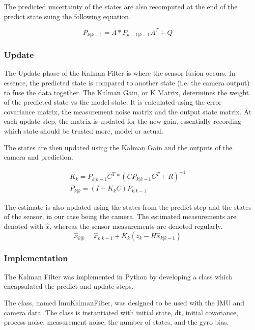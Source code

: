 \documentclass[bare_jrnl_transmag]{subfiles}
\begin{document}
The predicted uncertainty of the states are also recomputed at the end of the predict state suing the following equation.

\begin{equation*}
    P_{k|k-1} = A * P_{k-1|k-1} A^T + Q
\end{equation*}


    
\subsubsection{Update}
The Update phase of the Kalman Filter is where the sensor fusion occurs. In essence, the predicted state is compared to another state (i.e. the camera output) to fuse the data together. 
The Kalman Gain, or K Matrix, determines the weight of the predicted state vs the model state. It is calculated using the error covariance matrix, the measurement noise matrix and the output state matrix. 
At each update step, the matrix is updated for the new gain, essentially recording which state should be trusted more, model or actual.

The states are then updated using the Kalman Gain and the outputs of the camera and prediction.

\begin{eqnarray*}
    K_k = P_{k|k-1} C^T * (C P_{k|k-1} C^T + R)^{-1} \\[1em]
    P_{k|k} = (I - K_k C) P_{k|k-1}
\end{eqnarray*}

The estimate is also updated using the states from the predict step and the states of the sensor, in our case being the camera. 
The estimated measurements are denoted with $\hat{x}$, whereas the sensor measurements are denoted regularly. 
\begin{equation*}
    \hat{x}_{k|k} = \hat{x}_{k|k-1} + K_k (z_k - H \hat{x}_{k|k-1})
\end{equation*}

\subsubsection{Implementation}

The Kalman Filter was implemented in Python by developing a class which encapsulated the predict and update steps. 

The class, named ImuKalmanFilter, was designed to be used with the IMU and camera data. The class is instantiated with initial state, dt, initial covariance, process noise, measurement noise, the number of states, and the gyro bias. 
\end{document}
